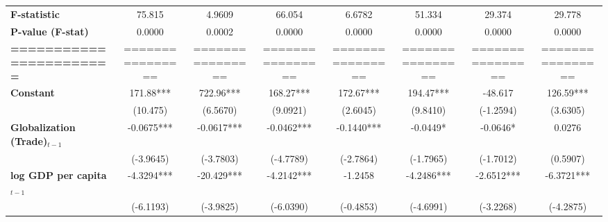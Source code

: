 \begin{center}
\begin{tabular}{lccccccc}
\textbf{F-statistic}               &        75.815        &            4.9609           &            66.054            &                6.6782               &              51.334              &            29.374           &             29.778             \\
\textbf{P-value (F-stat)}          &        0.0000        &            0.0002           &            0.0000            &                0.0000               &              0.0000              &            0.0000           &             0.0000             \\
\textbf{=======================}   &   ================   &       ================      &       ================       &           ================          &         ================         &       ================      &        ================        \\
\textbf{Constant}                     &      171.88***       &          722.96***          &          168.27***           &              172.67***              &            194.47***             &           -48.617           &           126.59***            \\
\textbf{ }                         &       (10.475)       &           (6.5670)          &           (9.0921)           &               (2.6045)              &             (9.8410)             &          (-1.2594)          &            (3.6305)            \\
\textbf{Globalization (Trade)$_{t-1}$}             &      -0.0675***      &          -0.0617***         &          -0.0462***          &              -0.1440***             &             -0.0449*             &           -0.0646*          &             0.0276             \\
\textbf{ }                         &      (-3.9645)       &          (-3.7803)          &          (-4.7789)           &              (-2.7864)              &            (-1.7965)             &          (-1.7012)          &            (0.5907)            \\
\textbf{log GDP per capita$_{t-1}$}           &      -4.3294***      &          -20.429***         &          -4.2142***          &               -1.2458               &            -4.2486***            &          -2.6512***         &           -6.3721***           \\
\textbf{ }                         &      (-6.1193)       &          (-3.9825)          &          (-6.0390)           &              (-0.4853)              &            (-4.6991)             &          (-3.2268)          &           (-4.2875)            \\

\end{tabular}
\end{center}
